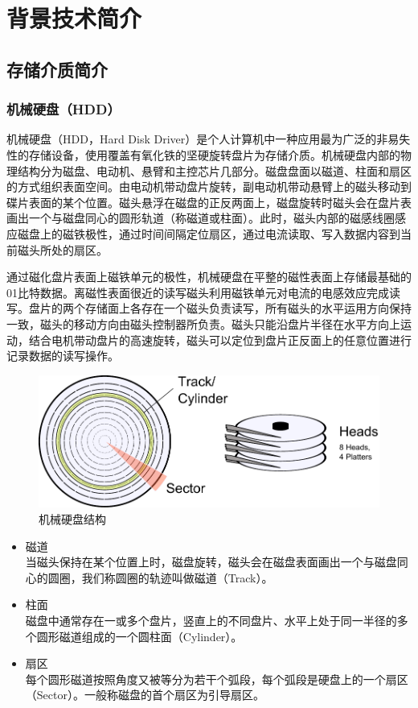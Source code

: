 
\chapter{背景技术简介}
\label{cha:related_work}

\section{存储介质简介}

\subsection{机械硬盘（HDD）}
机械硬盘\cite{hdd2009}（HDD，Hard Disk Driver）是个人计算机中一种应用最为广泛的非易失性的存储设备，使用覆盖有氧化铁的坚硬旋转盘片为存储介质。机械硬盘内部的物理结构分为磁盘、电动机、悬臂和主控芯片几部分。磁盘盘面以磁道、柱面和扇区的方式组织表面空间。由电动机带动盘片旋转，副电动机带动悬臂上的磁头移动到碟片表面的某个位置。磁头悬浮在磁盘的正反两面上，磁盘旋转时磁头会在盘片表画出一个与磁盘同心的圆形轨道（称磁道或柱面）。此时，磁头内部的磁感线圈感应磁盘上的磁铁极性，通过时间间隔定位扇区，通过电流读取、写入数据内容到当前磁头所处的扇区。

通过磁化盘片表面上磁铁单元的极性，机械硬盘在平整的磁性表面上存储最基础的01比特数据。离磁性表面很近的读写磁头利用磁铁单元对电流的电感效应完成读写。盘片的两个存储面上各存在一个磁头负责读写，所有磁头的水平运用方向保持一致，磁头的移动方向由磁头控制器所负责。磁头只能沿盘片半径在水平方向上运动，结合电机带动盘片的高速旋转，磁头可以定位到盘片正反面上的任意位置进行记录数据的读写操作。

\begin{figure}[H]
\centering
\includegraphics[width=0.6\linewidth]{./graph/hdd-struct}
\caption{机械硬盘结构}
\label{fig:hdd-struct}
\end{figure}

\begin{itemize}
\item 磁道
\\当磁头保持在某个位置上时，磁盘旋转，磁头会在磁盘表面画出一个与磁盘同心的圆圈，我们称圆圈的轨迹叫做磁道（Track）。
\item 柱面
\\磁盘中通常存在一或多个盘片，竖直上的不同盘片、水平上处于同一半径的多个圆形磁道组成的一个圆柱面（Cylinder）。
\item 扇区
\\每个圆形磁道按照角度又被等分为若干个弧段，每个弧段是硬盘上的一个扇区（Sector）。一般称磁盘的首个扇区为引导扇区。
\end{itemize}

